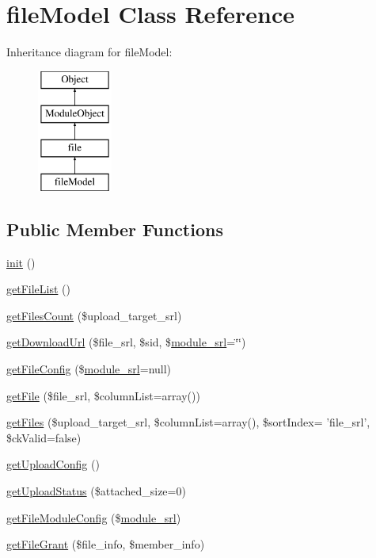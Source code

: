 \hypertarget{classfileModel}{\section{file\-Model Class Reference}
\label{classfileModel}
}
Inheritance diagram for file\-Model\-:\begin{figure}[H]
\begin{center}
\leavevmode
\includegraphics[height=4.000000cm]{classfileModel}
\end{center}
\end{figure}
\subsection*{Public Member Functions}
\begin{DoxyCompactItemize}
\item 
\hyperlink{classfileModel_a5dd9542d5c0ed61a7dd0158900ff5c92}{init} ()
\item 
\hyperlink{classfileModel_ad2b29057d5e61a15cb2caf794fc12291}{get\-File\-List} ()
\item 
\hyperlink{classfileModel_a37f83c04ce8adc09f576b94e04264f5b}{get\-Files\-Count} (\$upload\-\_\-target\-\_\-srl)
\item 
\hyperlink{classfileModel_ad626512a63e99f97d0e5a6fac7dae8c8}{get\-Download\-Url} (\$file\-\_\-srl, \$sid, \$\hyperlink{ko_8install_8php_a370bb6450fab1da3e0ed9f484a38b761}{module\-\_\-srl}=\char`\"{}\char`\"{})
\item 
\hyperlink{classfileModel_a81beeda11f761f561adb60ebc72d6187}{get\-File\-Config} (\$\hyperlink{ko_8install_8php_a370bb6450fab1da3e0ed9f484a38b761}{module\-\_\-srl}=null)
\item 
\hyperlink{classfileModel_a1475f2eb6cc740bf7f5ef67a4654fb24}{get\-File} (\$file\-\_\-srl, \$column\-List=array())
\item 
\hyperlink{classfileModel_a149c4f1e8710ec09c7dab5284b72bd48}{get\-Files} (\$upload\-\_\-target\-\_\-srl, \$column\-List=array(), \$sort\-Index= 'file\-\_\-srl', \$ck\-Valid=false)
\item 
\hyperlink{classfileModel_a0d268e1f840c7495de96ed511c7053fc}{get\-Upload\-Config} ()
\item 
\hyperlink{classfileModel_a63c3d6b41db33e55521cd3f0b10ab493}{get\-Upload\-Status} (\$attached\-\_\-size=0)
\item 
\hyperlink{classfileModel_aefe867916bce4a5f3451bb9afc464844}{get\-File\-Module\-Config} (\$\hyperlink{ko_8install_8php_a370bb6450fab1da3e0ed9f484a38b761}{module\-\_\-srl})
\item 
\hyperlink{classfileModel_a129e251c2a4ed575126c902a64ed3f59}{get\-File\-Grant} (\$file\-\_\-info, \$member\-\_\-info)
\end{DoxyCompactItemize}
